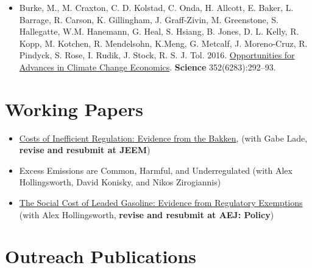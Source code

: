 \documentclass{res} %
\begin{document}
\begin{resume}
\begin{itemize}
	\item[]  Burke, M., M. Craxton, C. D. Kolstad, C. Onda, H. Allcott, E. Baker, L. Barrage, R. Carson, K. Gillingham, J. Graff-Zivin, M. Greenstone, S. Hallegatte, W.M. Hanemann, G. Heal, S. Hsiang, B. Jones, D. L. Kelly, R. Kopp, M. Kotchen, R. Mendelsohn, K.Meng, G. Metcalf, J. Moreno-Cruz, R. Pindyck, S. Rose, I. Rudik, J. Stock, R. S. J. Tol. 2016. \href{http://science.sciencemag.org/content/352/6283/292.abstract}{Opportunities for Advances in Climate Change Economics}. \textbf{Science} 352(6283):292--93.
\end{itemize}
\vspace{-.075in}

\section{Working Papers}

\begin{itemize} %
	\item[] \href{https://papers.ssrn.com/sol3/papers.cfm?abstract_id=3086728}{Costs of Inefficient Regulation: Evidence from the Bakken}, (with Gabe Lade, \textbf{revise and resubmit at JEEM})
	\item[] Excess Emissions are Common, Harmful, and Underregulated (with Alex Hollingsworth, David Konisky, and Nikos Zirogiannis)
	
	\item[] \href{https://osf.io/preprints/socarxiv/rdy6g}{The Social Cost of Leaded Gasoline: Evidence from Regulatory Exemptions} (with Alex Hollingsworth, \textbf{revise and resubmit at AEJ: Policy})

\end{itemize}
\vspace{-.075in}
\section{Outreach Publications}


\end{resume}
\end{document}
